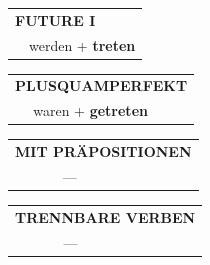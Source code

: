 \documentclass[10pt,a4paper]{revtex4-2}
\begin{document}
\begin{verbbox}
\begin{tabular}{rl}
    \multicolumn{2}{l}{\textbf{FUTURE I} }\\
   & werden + \textbf{treten}\\
 
  \end{tabular}
\hfill
   \begin{tabular}{rl}
      \multicolumn{2}{l}{\textbf{PLUSQUAMPERFEKT}}\\
   & waren + \textbf{getreten}\\
  \end{tabular}
  
  \vspace{10pt}



\begin{tabular}{lll}
\multicolumn{3}{l}{\textbf{MIT PRÄPOSITIONEN}}\\
& ---\\
\end{tabular}
\hfill
\begin{tabular}{lll}
\multicolumn{3}{l}{\textbf{TRENNBARE VERBEN}}\\
& ---\\
\end{tabular}

  \vspace{-5pt}

\end{verbbox}
\end{document}
